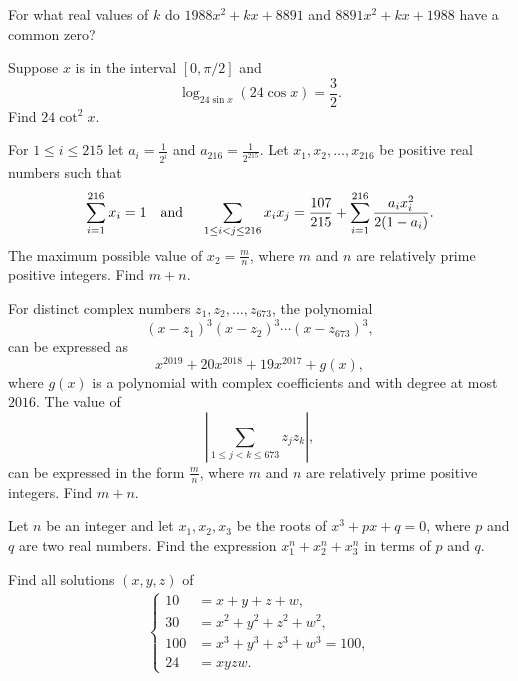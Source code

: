 \documentclass[12pt,a4paper]{memoir}
\theoremstyle{definition}
\begin{document}
\begin{question}[name={1988 Canada}]
	For what real values of $k$ do $1988x^2 + kx + 8891$ and $8891x^2 + kx + 1988$ have a common zero?
\end{question}

\begin{question}[name={2011 AIME I \#9}]
	Suppose $x$ is in the interval $[0,\pi/2]$ and \[\log_{24\sin{x}}(24\cos{x})=\frac{3}{2}.\] Find $24\cot^2{x}$.
\end{question}


\begin{question}[name={2016 AIME}]
	For $1\leq i\leq 215$ let $a_i=\frac{1}{2^i}$ and $a_{216}=\frac{1}{2^{215}}$. Let $x_1,x_2,\ldots,x_{216}$ be positive real numbers such that\[ \sum\limits_{i=1}^{216} x_i=1 \text{\quad and \quad} \sum\limits_{1\leq i<j \leq 216} x_ix_j = \frac{107}{215}+ \sum\limits_{i=1}^{216} \frac{a_ix_i^2}{2(1-a_i)}.\]The maximum possible value of $x_2=\frac{m}{n}$, where $m$ and $n$ are relatively prime positive integers. Find $m+n$.
\end{question}


\begin{question}[name={2019 AIME}]
	For distinct complex numbers $z_1,z_2,\dots,z_{673}$, the polynomial
	\[ (x-z_1)^3(x-z_2)^3 \cdots (x-z_{673})^3, \]
	can be expressed as \[x^{2019} + 20x^{2018} + 19x^{2017}+g(x),\] where $g(x)$ is a polynomial with complex coefficients and with degree at most $2016$. The value of
	\[ \left| \sum_{1 \le j <k \le 673} z_jz_k \right|, \] 
	can be expressed in the form $\tfrac{m}{n}$, where $m$ and $n$ are relatively prime positive integers. Find $m+n$.
\end{question}



\begin{question}
	Let $n$ be an integer and let $x_1,x_2,x_3$ be the roots of $x^3+px+q=0$, where $p$ and $q$ are two real numbers. Find the expression $x_1^n+x_2^n +x_3^n$ in terms of $p$ and $q.$
\end{question}

\begin{question}
	Find all solutions $(x,y,z)$ of
	\begin{align*}
		\begin{cases}
			10  &= x+y+z+w,\\
			30  &= x^2+y^2+z^2+w^2,\\
			100 &= x^3+y^3+z^3+w^3=100,\\
			24  &= xyzw.
		\end{cases}
	\end{align*}
\end{question}
\end{document}
